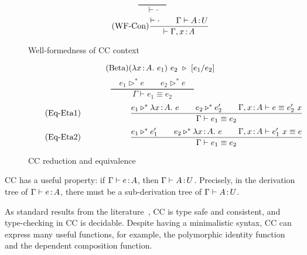 \begin{figure}
	\begin{equation}
		\tag{WF-Empty}
		\frac{ }{\quad \vdash {\cdot} \quad}
	\end{equation} \hspace{0.5cm}
	\begin{equation}
		\tag{WF-Con}
		\frac
			{\vdash \cdot \qquad \Gamma \vdash A \hspace{0.5mm}{:}\hspace{0.5mm} U}
			{\vdash \Gamma , x\hspace{0.5mm}{:}\hspace{0.5mm} A}
	\end{equation}
	\caption{Well-formedness of CC context}
    \label{fig:cc context}
\end{figure}

\begin{figure}[H]
	\begin{equation*}
		\tag{Beta}
		(\lam{x}{A}{e_1}) \ e_2 \ \triangleright \ \sub{e_1}{e_2}
	\end{equation*}
	\begin{equation}
		\tag{Eq-reduce}
		\frac
			{\quad e_1 \triangleright^* e \qquad e_ 2\triangleright^* e \quad}
			{\Gamma \vdash e_1 \equiv e_2}
	\end{equation}
	\begin{equation}
		\tag{Eq-Eta1}
		\qquad\qquad\qquad
		\frac
			{e_1 \triangleright^* \lambda x\hspace{0.5mm}{:}\hspace{0.5mm} A.\ e \qquad
			 e_2 \triangleright^* e_2' \qquad
			 \Gamma, x \hspace{0.5mm}{:}\hspace{0.5mm} A \vdash e \equiv e_2'\ x}
			{\Gamma \vdash e_1 \equiv e_2}
	\end{equation}
	\begin{equation}
		\tag{Eq-Eta2}
		\qquad\qquad\qquad
		\frac
			{ e_1 \triangleright^* e_1' \qquad
			 e_2 \triangleright^* \lambda x\hspace{0.5mm}{:}\hspace{0.5mm} A.\ e \qquad
			 \Gamma, x \hspace{0.5mm}{:}\hspace{0.5mm} A \vdash e_1'\ x \equiv e }
			{\Gamma \vdash e_1 \equiv e_2}
	\end{equation}
	\caption{CC reduction and equivalence}
    \label{fig:cc equivalence}
\end{figure}

CC has a useful property: if $\Gamma \vdash e \hspace{0.5mm}{:}\hspace{0.5mm} A$, then $\Gamma \vdash A \hspace{0.5mm}{:}\hspace{0.5mm} U$. Precisely, in the derivation tree of $\Gamma \vdash e \hspace{0.5mm}{:}\hspace{0.5mm} A$, there must be a sub-derivation tree of $\Gamma \vdash A \hspace{0.5mm}{:}\hspace{0.5mm} U$.

As standard results from the literature~\cite{DBLP:journals/iandc/CoquandH88,DBLP:phd/ethos/Luo90}, CC is type safe and consistent, and type-checking in CC is decidable. Despite having a minimalistic syntax, CC can express many useful functions, for example, the polymorphic identity function and the dependent composition function.

